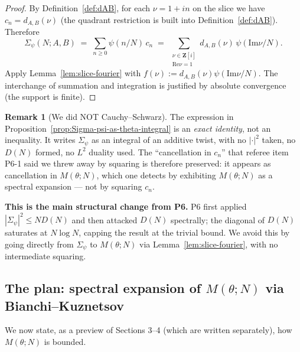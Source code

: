 \documentclass[11pt]{article}
\theoremstyle{definition}
\newtheorem{remark}[theorem]{Remark}
\newcommand{\Z}{\mathbf{Z}}
\newcommand{\Zi}{\Z[i]}
\renewcommand{\Re}{\mathrm{Re}}
\renewcommand{\Im}{\mathrm{Im}}
\begin{document}
\begin{proof}
By Definition~\ref{def:dAB}, for each $\nu=1+in$ on the slice we have $c_n=d_{A,B}(\nu)$ (the quadrant restriction is built into Definition~\ref{def:dAB}). Therefore
\[
\Sigma_\psi(N;A,B)\;=\;\sum_{n\ge 0}\psi(n/N)\,c_n\;=\;\sum_{\substack{\nu\in\Zi\\\Re\nu=1}}d_{A,B}(\nu)\,\psi(\Im\nu/N).
\]
Apply Lemma~\ref{lem:slice-fourier} with $f(\nu):=d_{A,B}(\nu)\psi(\Im\nu/N)$. The interchange of summation and integration is justified by absolute convergence (the support is finite).
\end{proof}

\begin{remark}[We did NOT Cauchy--Schwarz]\label{rmk:no-CS}
The expression in Proposition~\ref{prop:Sigma-psi-as-theta-integral} is an \emph{exact identity}, not an inequality. It writes $\Sigma_\psi$ as an integral of an additive twist, with no $|\cdot|^2$ taken, no $D(N)$ formed, no $L^2$ duality used. The ``cancellation in $c_n$'' that referee item P6-1 said we threw away by squaring is therefore preserved: it appears as cancellation in $M(\theta;N)$, which one detects by exhibiting $M(\theta;N)$ as a spectral expansion --- not by squaring $c_n$.

\textbf{This is the main structural change from P6.} P6 first applied $|\Sigma_\psi|^2\le N D(N)$ and then attacked $D(N)$ spectrally; the diagonal of $D(N)$ saturates at $N\log N$, capping the result at the trivial bound. We avoid this by going directly from $\Sigma_\psi$ to $M(\theta;N)$ via Lemma~\ref{lem:slice-fourier}, with no intermediate squaring.
\end{remark}

\subsection{The plan: spectral expansion of $M(\theta;N)$ via Bianchi--Kuznetsov}\label{ssec:typeII-plan}

We now state, as a preview of Sections 3--4 (which are written separately), how $M(\theta;N)$ is bounded.
\end{document}
